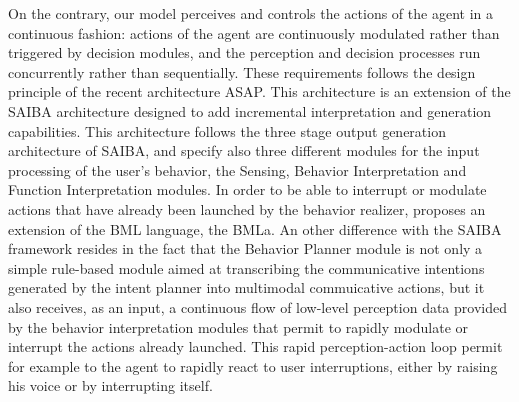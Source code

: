 On the contrary, our model perceives and controls the actions of the agent in a continuous fashion: actions of the agent are continuously modulated rather than triggered by decision modules, and the perception and decision processes run concurrently rather than sequentially. 
These requirements follows the design principle of the recent architecture ASAP. This architecture is an extension of the SAIBA architecture \cite{kopp_architecture_2014} designed to add incremental interpretation and generation capabilities. This architecture follows the three stage output generation architecture of SAIBA, and specify also three different modules for the input processing of the user's behavior, the Sensing, Behavior Interpretation and Function Interpretation modules. 
In order to be able to interrupt or modulate actions that have already been launched by the behavior realizer, \cite{kopp_architecture_2014} proposes an extension of the BML language, the BMLa.  
An other difference with the SAIBA framework resides in the fact that the Behavior Planner module is not only a simple rule-based module aimed at transcribing the communicative intentions generated by the intent planner into multimodal commuicative actions, but it also receives, as an input, a continuous flow of low-level perception data provided by the behavior interpretation modules that permit to rapidly modulate or interrupt the actions already launched. This rapid perception-action loop permit for example to the agent to rapidly react to user interruptions, either by raising his voice or by interrupting itself.   
